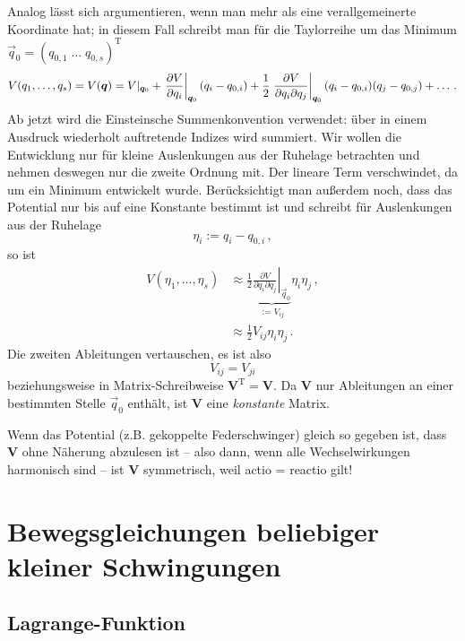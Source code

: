 \documentclass[paper=a4, fontsize=11.0pt, abstractoff, DIV12]{scrartcl}
\begin{document}
Analog lässt sich argumentieren, wenn man mehr als eine
verallgemeinerte Koordinate hat; in diesem Fall schreibt man für die Taylorreihe
um das Minimum $\vec{q}_0 = (q_{0,1}\;\dots\;q_{0,s})^\mathrm{T}$
\begin{equation}
V(q_1, \dots, q_s) = V({\boldsymbol{q}}) = V|_{{\boldsymbol{q}}_0} + \left.\frac{\partial V}{\partial q_i}\right|_{{\boldsymbol{q}}_0} (q_i - q_{0,i}) + \frac{1}{2} \left.\frac{\partial V}{\partial q_i \partial q_j}\right|_{{\boldsymbol{q}}_0} (q_i - q_{0,i}) (q_j - q_{0,j}) + \dots\,.
\end{equation}
Ab jetzt wird die Einsteinsche Summenkonvention verwendet: über in einem Ausdruck wiederholt
auftretende Indizes wird summiert. Wir wollen die Entwicklung nur für kleine
Auslenkungen aus der Ruhelage betrachten und nehmen deswegen nur die zweite
Ordnung mit. Der  lineare Term verschwindet, da um ein Minimum entwickelt
wurde. Berücksichtigt man außerdem noch, dass das Pot\-ential nur bis auf eine
Konstante bestimmt ist und schreibt für Auslenkungen aus der Ruhelage
\begin{equation}
\eta_i := q_i - q_{0,i}\,,
\end{equation}
so ist
\begin{align}
V(\eta_1, \dots, \eta_s) &\approx \frac{1}{2} \underbrace{\left.\frac{\partial V}{\partial q_i \partial q_j}\right|_{\vec{q}_0}}_{:= V_{ij}} \eta_i\eta_j \, ,\nonumber\\
&\approx \frac{1}{2} V_{ij} \eta_i\eta_j \, .
\label{eq:Vapprox}
\end{align}
Die zweiten Ableitungen vertauschen, es ist also
\begin{equation}
V_{ij} = V_{ji}
\end{equation}
beziehungsweise in Matrix-Schreibweise $\mathbf{V}^{\mathrm{T}} = \mathbf{V}$. Da
$\mathbf V$ nur Ableitungen an einer bestimmten Stelle $\vec q_0$ enthält,
ist $\mathbf V$ eine \emph{konstante} Matrix.

Wenn das Potential (z.B. gekoppelte Federschwinger) gleich so gegeben ist, dass
$\mathbf{V}$ ohne Näherung abzulesen ist -- also dann, wenn alle
Wechselwirkungen harmonisch sind -- ist $\mathbf{V}$ symmetrisch, weil actio =
reactio gilt!

\section{Bewegsgleichungen beliebiger kleiner Schwingungen}

\subsection{Lagrange-Funktion}
\end{document}
